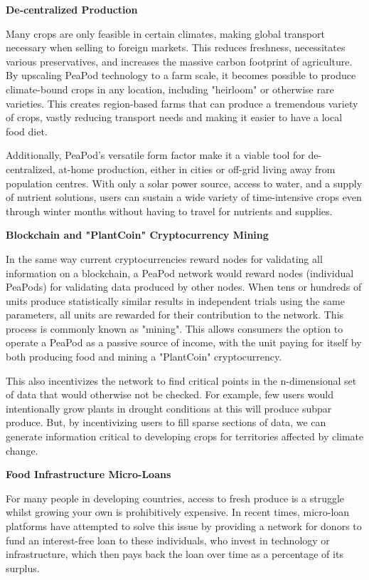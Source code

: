 \documentclass{report}
\begin{document}
\textbf{De-centralized Production} %

Many crops are only feasible in certain climates, making global transport necessary when selling to foreign markets. This reduces freshness, necessitates various preservatives, and increases the massive carbon footprint of agriculture. By upscaling PeaPod technology to a farm scale, it becomes possible to produce climate-bound crops in any location, including "heirloom" or otherwise rare varieties. This creates region-based farms that can produce a tremendous variety of crops, vastly reducing transport needs and making it easier to have a local food diet.

Additionally, PeaPod's versatile form factor make it a viable tool for de-centralized, at-home production, either in cities or off-grid living away from population centres. With only a solar power source, access to water, and a supply of nutrient solutions, users can sustain a wide variety of time-intensive crops even through winter months without having to travel for nutrients and supplies.

\textbf{Blockchain and "PlantCoin" Cryptocurrency Mining}

In the same way current cryptocurrencies reward nodes for validating all information on a blockchain, a PeaPod network would reward nodes (individual PeaPods) for validating data produced by other nodes. When tens or hundreds of units produce statistically similar results in independent trials using the same parameters, all units are rewarded for their contribution to the network. This process is commonly known as "mining". This allows consumers the option to operate a PeaPod as a passive source of income, with the unit paying for itself by both producing food and mining a "PlantCoin" cryptocurrency.

This also incentivizes the network to find critical points in the n-dimensional set of data that would otherwise not be checked. For example, few users would intentionally grow plants in drought conditions at this will produce subpar produce. But, by incentivizing users to fill sparse sections of data, we can generate information critical to developing crops for territories affected by climate change.

\textbf{Food Infrastructure Micro-Loans}

For many people in developing countries, access to fresh produce is a struggle whilst growing your own is prohibitively expensive. In recent times, micro-loan platforms have attempted to solve this issue by providing a network for donors to fund an interest-free loan to these individuals, who invest in technology or infrastructure, which then pays back the loan over time as a percentage of its surplus. 
\end{document}
